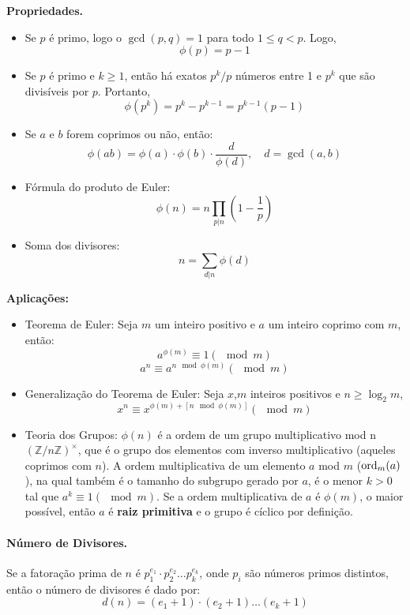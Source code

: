\textbf{Propriedades.}
\begin{multicols}{2}
    \begin{itemize}
        \item Se $p$ é primo, logo o $\gcd(p,q) = 1$ para todo $1\leq q < p$. Logo,
        $$\phi(p) = p-1$$
        \item Se $p$ é primo e $k \ge 1$, então há exatos $p^k/p$ números entre 1 e $p^k$ que são divisíveis por $p$. Portanto,
        $$\phi(p^k) = p^k - p^{k-1} = p^{k-1}(p-1)$$
        \item Se $a$ e $b$ forem coprimos ou não, então:
        $$\phi(ab)=\phi(a)\cdot \phi(b) \cdot \frac{d}{\phi(d)},\quad d = \gcd(a,b)$$
        \item Fórmula do produto de Euler:
        $$\phi(n)=n\prod_{p|n}(1-\frac{1}{p})$$
        \item Soma dos divisores:
        $$n = \sum_{d|n}\phi(d)$$
    \end{itemize}
    
\end{multicols}

\textbf{Aplicações:}
\begin{itemize}
    \item Teorema de Euler: Seja $m$ um inteiro positivo e $a$ um inteiro coprimo com $m$, então:
    $$a^{\phi(m)} \equiv 1 (\mod m)$$
    $$a^n \equiv a^{n \mod \phi(m)} (\mod m)$$
    
    \item Generalização do Teorema de Euler: Seja $x$,$m$ inteiros positivos e $n \ge \log_2m$,
    $$x^n \equiv x^{\phi(m)+[n \mod \phi(m)]}(\mod m)$$
    
    \item Teoria dos Grupos: $\phi(n)$ é a ordem de um grupo multiplicativo mod n $(\mathbb{Z}/n\mathbb{Z})^{\times}$, que é o grupo dos elementos com inverso multiplicativo (aqueles coprimos com $n$). A ordem multiplicativa de um elemento $a$ mod $m$ ($\textnormal{ord}_m(a)$), na qual também é o tamanho do subgrupo gerado por $a$, é o menor $k > 0$ tal que $a^k \equiv 1 (\mod m)$. Se a ordem multiplicativa de $a$ é $\phi(m)$, o maior possível, então $a$ é \textbf{raiz primitiva} e o grupo é cíclico por definição.
    
\end{itemize}

\paragraph{Número de Divisores.} Se a fatoração prima de $n$ é $p_1^{e_1}\cdot p_2^{e_2}\dots  p_k^{e_k}$, onde $p_i$ são números primos distintos, então o número de divisores é dado por:
$$d(n) = (e_1+1)\cdot(e_2+1) \dots (e_k+1)$$

